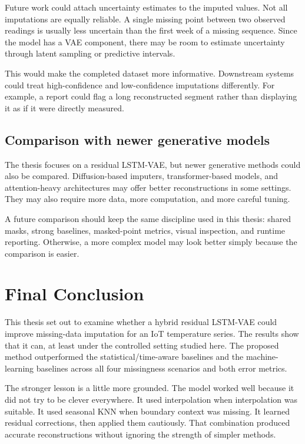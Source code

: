 Future work could attach uncertainty estimates to the imputed values. Not all imputations are equally reliable. A single missing point between two observed readings is usually less uncertain than the first week of a missing sequence. Since the model has a VAE component, there may be room to estimate uncertainty through latent sampling or predictive intervals.

This would make the completed dataset more informative. Downstream systems could treat high-confidence and low-confidence imputations differently. For example, a report could flag a long reconstructed segment rather than displaying it as if it were directly measured.

\subsection{Comparison with newer generative models}

The thesis focuses on a residual LSTM-VAE, but newer generative methods could also be compared. Diffusion-based imputers, transformer-based models, and attention-heavy architectures may offer better reconstructions in some settings. They may also require more data, more computation, and more careful tuning.

A future comparison should keep the same discipline used in this thesis: shared masks, strong baselines, masked-point metrics, visual inspection, and runtime reporting. Otherwise, a more complex model may look better simply because the comparison is easier.

\section{Final Conclusion}

This thesis set out to examine whether a hybrid residual LSTM-VAE could improve missing-data imputation for an IoT temperature series. The results show that it can, at least under the controlled setting studied here. The proposed method outperformed the statistical/time-aware baselines and the machine-learning baselines across all four missingness scenarios and both error metrics.

The stronger lesson is a little more grounded. The model worked well because it did not try to be clever everywhere. It used interpolation when interpolation was suitable. It used seasonal KNN when boundary context was missing. It learned residual corrections, then applied them cautiously. That combination produced accurate reconstructions without ignoring the strength of simpler methods.


